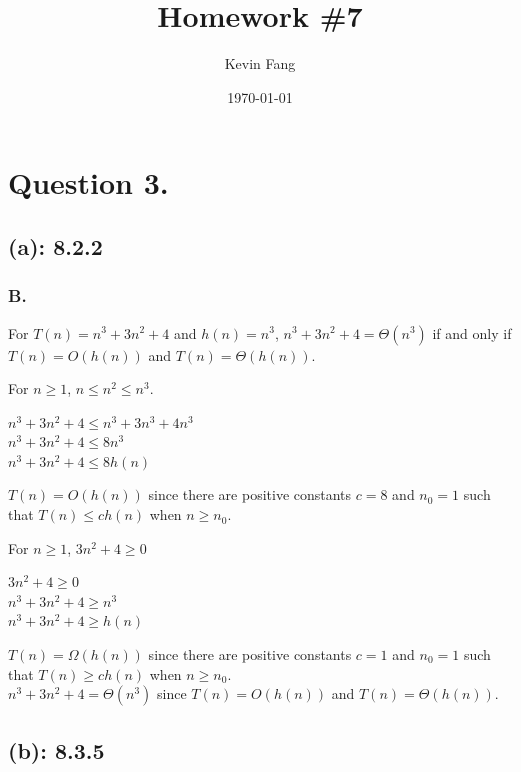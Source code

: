 \documentclass[titlepage]{article}\pagestyle{empty}
\author{Kevin Fang}
\title{Homework \#7}
\date{\today}
\begin{document}
\maketitle

\pagebreak
\section*{Question 3.}
\subsection*{(a): 8.2.2}
\subsubsection*{B.} 

For $T(n) = n^3 + 3n^2 + 4$ and $h(n) = n^3$, $n^3 + 3n^2 + 4 = \Theta(n^3)$ if and only if $T(n) = O(h(n))$ and $T(n) = \Theta(h(n))$.\\
\begin{center}
For $n \geq 1$, $n \leq n^2 \leq n^3$.\\
\end{center}
\begin{center}
$n^3 + 3n^2 + 4 \leq n^3 + 3n^3 + 4n^3$\\
$n^3 + 3n^2 + 4 \leq 8n^3$\\
$n^3 + 3n^2 + 4 \leq 8h(n)$\\
\end{center}
$T(n) = O(h(n))$ since there are positive constants $c = 8$ and $n_0 = 1$ such that $T(n) \leq ch(n)$ when $n \geq n_0$.\\
\begin{center}
For $n \geq 1$, $3n^2 + 4 \geq 0$\\
\end{center}
\begin{center}
$3n^2 + 4 \geq 0$\\
$n^3 + 3n^2 + 4 \geq n^3$\\
$n^3 + 3n^2 + 4 \geq h(n)$\\
\end{center}
$T(n) = \Omega(h(n))$ since there are positive constants $c = 1$ and $n_0 = 1$ such that $T(n) \geq ch(n)$ when $n \geq n_0$.\\
$n^3 + 3n^2 + 4 = \Theta(n^3)$ since $T(n) = O(h(n))$ and $T(n) = \Theta(h(n))$.\\

\subsection*{(b): 8.3.5}
\end{document}
